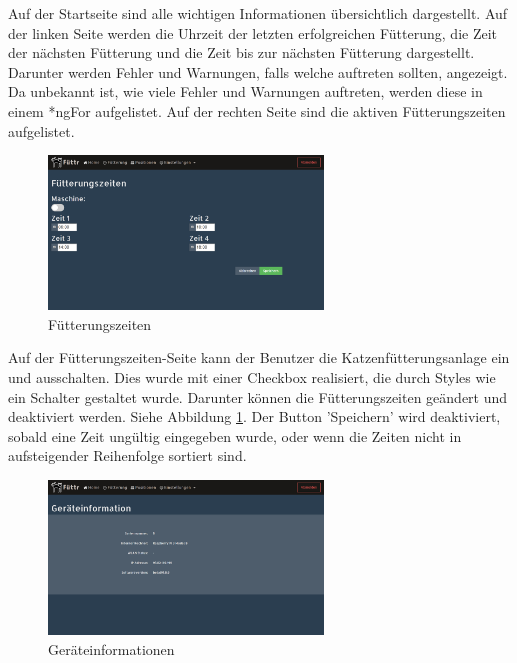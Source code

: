 Auf der Startseite sind alle wichtigen Informationen übersichtlich dargestellt. Auf der linken Seite werden die Uhrzeit der letzten erfolgreichen Fütterung, die Zeit der nächsten Fütterung und die Zeit bis zur nächsten Fütterung dargestellt. Darunter werden Fehler und Warnungen, falls welche auftreten sollten, angezeigt. Da unbekannt ist, wie viele Fehler und Warnungen auftreten, werden diese in einem *ngFor aufgelistet. Auf der rechten Seite sind die aktiven Fütterungszeiten aufgelistet. \newpage

\begin{figure}
\vspace{-10pt}
  \begin{center}
    \includegraphics[width=0.65\textwidth]{Bilder/Greistorfer/Fuetterungszeiten}
  \end{center}
  \caption{Fütterungszeiten}
  \label{Fütterungszeiten}
  \vspace{-10pt}
\end{figure}

Auf der Fütterungszeiten-Seite kann der Benutzer die Katzenfütterungsanlage ein und ausschalten. Dies wurde mit einer Checkbox realisiert, die durch Styles wie ein Schalter gestaltet wurde. Darunter können die Fütterungszeiten geändert und deaktiviert werden. Siehe Abbildung \ref{Fütterungszeiten}. Der Button 'Speichern' wird deaktiviert, sobald eine Zeit ungültig eingegeben wurde, oder wenn die Zeiten nicht in aufsteigender Reihenfolge sortiert sind. \\

\begin{figure}
\vspace{-10pt}
  \begin{center}
    \includegraphics[width=0.65\textwidth]{Bilder/Greistorfer/Gerateinformation}
  \end{center}
  \caption{Geräteinformationen}
  \label{Geräteinformationen}
  \vspace{-60pt}
\end{figure}

